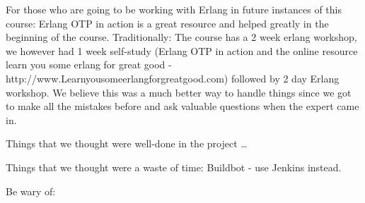 For those who are going to be working with Erlang in future instances of this course:
Erlang OTP in action is a great resource and helped greatly in the beginning of the course. 
Traditionally: The course has a 2 week erlang workshop, we however had 1 week self-study (Erlang OTP in action and  the online resource learn you some erlang for great good - http://www.Learnyousomeerlangforgreatgood.com) followed by 2 day Erlang workshop. We believe this was a much better way to handle things since we got to make all the mistakes before and ask valuable questions when the expert came in. 

Things that we thought were well-done in the project \ldots

Things that we thought were a waste of time:
Buildbot - use Jenkins instead.


Be wary of: